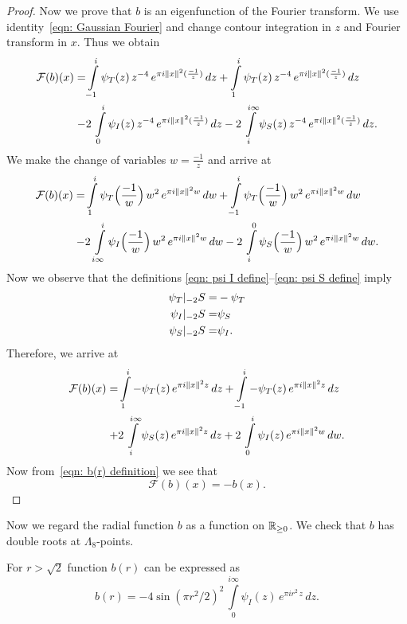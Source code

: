 \begin{proof}
  Now we prove that $b$ is an eigenfunction of the Fourier transform. We use identity~\eqref{eqn: Gaussian Fourier} and change contour integration in $z$ and Fourier transform in $x$. Thus we obtain
  \begin{align}
    \mathcal{F}(b)(x)= & \int\limits_{-1}^{i}\psi_T(z)\,z^{-4}\,e^{\pi i \|x\|^2 (\frac{-1}{z})}\,dz
      + \int\limits_{1}^{i}\psi_T(z)\,z^{-4}\,e^{\pi i \|x\|^2 (\frac{-1}{z})}\,dz \notag \\
    -& 2\,\int\limits_{0}^{i}\psi_I(z)\,z^{-4}\,e^{\pi i \|x\|^2 (\frac{-1}{z})}\,dz
    - 2\,\int\limits_{i}^{i\infty}\psi_S(z)\,z^{-4}\,e^{\pi i \|x\|^2 (\frac{-1}{z})}\,dz. \notag
  \end{align}
  We make the change of variables $w=\frac{-1}{z}$ and arrive at
  \begin{align}
    \mathcal{F}(b)(x)= & \int\limits_{1}^{i}\psi_T\Big(\frac{-1}{w}\Big)\,w^{2}\,e^{\pi i \|x\|^2 w}\,dw
      + \int\limits_{-1}^{i}\psi_T\Big(\frac{-1}{w}\Big)\,w^{2}\,e^{\pi i \|x\|^2 w}\,dw \notag \\
    -& 2\,\int\limits_{i\infty}^{i}\psi_I\Big(\frac{-1}{w}\Big)\,w^{2}\,e^{\pi i \|x\|^2 w}\,dw
    - 2\,\int\limits_{i}^{0}\psi_S\Big(\frac{-1}{w}\Big)\,w^{2}\,e^{\pi i \|x\|^2 w}\,dw.\notag
  \end{align}
  Now we observe that the definitions \eqref{eqn: psi I define}--\eqref{eqn: psi S define}   imply
  \begin{align}\psi_T|_{-2}S=&-\psi_T \notag \\
  \psi_I|_{-2}S=&\psi_S \notag \\
  \psi_S|_{-2}S=&\psi_I. \notag
  \end{align}
  Therefore, we arrive at
  \begin{align}
    \mathcal{F}(b)(x)= & \int\limits_{1}^{i}-\psi_T(z)\,e^{\pi i \|x\|^2 z}\,dz
      + \int\limits_{-1}^{i}-\psi_T(z)\,e^{\pi i \|x\|^2 z}\,dz \notag \\
    +& 2\,\int\limits_{i}^{i\infty}\psi_S(z)\,e^{\pi i \|x\|^2 z}\,dz
    + 2\,\int\limits_{0}^{i}\psi_I(z)\,e^{\pi i \|x\|^2 w}\,dw.\notag
  \end{align}
  Now from~\eqref{eqn: b(r) definition} we see that
  $$ \mathcal{F}(b)(x)=-b(x). $$
  \end{proof}
  Now we regard the radial function  $b$ as a function on $\mathbb{R}_{\geq0}$. We check that $b$ has double roots at $\Lambda_8$-points.
  \begin{proposition}\label{prop: b(r) double zeroes}
  For $r>\sqrt{2}$ function $b(r)$ can be expressed as
  \begin{equation}\label{eqn: b double zeroes}
    b(r)=-4\sin(\pi r^2/2)^2\,\int\limits_{0}^{i\infty}\psi_I(z)\,e^{\pi i r^2 \,z}\,dz.
  \end{equation}
  \end{proposition}
